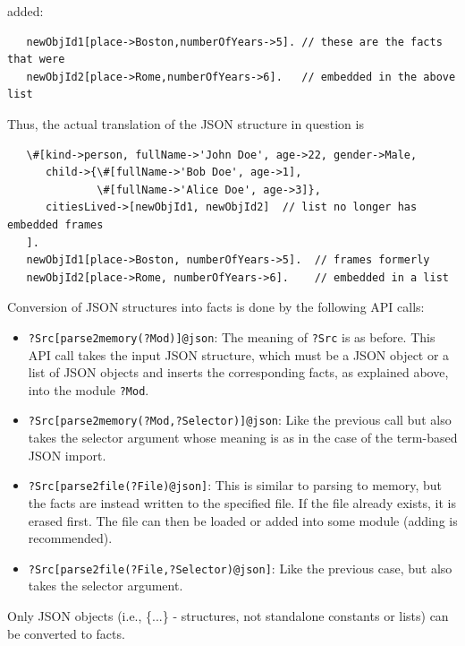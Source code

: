 added:
\begin{verbatim}
   newObjId1[place->Boston,numberOfYears->5]. // these are the facts that were
   newObjId2[place->Rome,numberOfYears->6].   // embedded in the above list
\end{verbatim}
Thus, the actual translation of the JSON structure in question is
\begin{verbatim}
   \#[kind->person, fullName->'John Doe', age->22, gender->Male,
      child->{\#[fullName->'Bob Doe', age->1],
              \#[fullName->'Alice Doe', age->3]},
      citiesLived->[newObjId1, newObjId2]  // list no longer has embedded frames
   ].
   newObjId1[place->Boston, numberOfYears->5].  // frames formerly
   newObjId2[place->Rome, numberOfYears->6].    // embedded in a list
\end{verbatim}

Conversion of JSON structures into facts is done by the following API calls:
\begin{itemize}
\item  \texttt{?Src[parse2memory(?Mod)]@\bs{}json}:
  The meaning of \texttt{?Src} is as before. This API call takes the input
  JSON structure, which must be a JSON object or a list of JSON objects
  and inserts the corresponding facts, as explained above, into the \ERGO module
  \texttt{?Mod}.
\item \texttt{?Src[parse2memory(?Mod,?Selector)]@\bs{}json}:
  Like the previous call but also takes the selector argument whose meaning
  is as in the case of the term-based JSON import.
\item \texttt{?Src[parse2file(?File)@\bs{}json]}:
  This is similar to parsing to memory, but the facts are instead written
  to the specified file. If the file already exists, it is erased first.
  The file can then be loaded or added into some \ERGO module (adding is
  recommended).
\item \texttt{?Src[parse2file(?File,?Selector)@\bs{}json]}:
  Like the previous case, but also takes the selector argument.
\end{itemize}
Only JSON objects (i.e., \{...\} - structures, not standalone constants or
lists) can be converted to facts.

